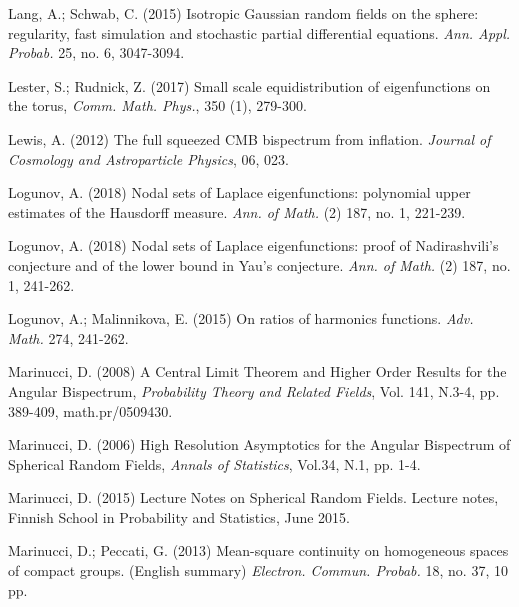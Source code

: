\begin{thebibliography}{99}
	
	 Lang, A.; Schwab, C. (2015) Isotropic Gaussian random fields on the sphere: regularity, fast simulation and stochastic partial differential equations. \textit{Ann. Appl. Probab.} 25, no. 6, 3047-3094.
	
	  Lester, S.; Rudnick, Z. (2017) Small scale equidistribution of eigenfunctions on the torus, \textit{Comm. Math. Phys.}, 350 (1), 279-300.
	
	 Lewis, A. (2012) The full squeezed CMB bispectrum from inflation. \textit{Journal of Cosmology and Astroparticle Physics}, 06, 023. 
	
	 Logunov, A. (2018) Nodal sets of Laplace eigenfunctions: polynomial upper estimates of the Hausdorff measure. \textit{Ann. of Math.} (2) 187, no. 1, 221-239.
	
	 Logunov, A. (2018) Nodal sets of Laplace eigenfunctions: proof of Nadirashvili's conjecture and of the lower bound in Yau's conjecture. \textit{ Ann. of Math. }(2) 187, no. 1, 241-262.
	
	 Logunov, A.; Malinnikova, E. (2015) On ratios of harmonics functions. \textit{Adv. Math.} 274, 241-262. 
	
	
	
	
	 Marinucci, D. (2008) A Central Limit Theorem and Higher Order Results for the Angular Bispectrum, \textit{Probability Theory and Related Fields}, Vol. 141, N.3-4, pp. 389-409, math.pr/0509430.
	
	 Marinucci, D. (2006) High Resolution Asymptotics for the Angular Bispectrum of Spherical Random Fields, \textit{Annals of Statistics}, Vol.34, N.1, pp. 1-4.
	
	 Marinucci, D. (2015) Lecture Notes on Spherical Random Fields. Lecture notes, Finnish School in Probability and Statistics, June 2015.
	
	
	 Marinucci, D.; Peccati, G. (2013) Mean-square continuity on homogeneous spaces of compact groups. (English summary) 
	\textit{Electron. Commun. Probab.} 18, no. 37, 10 pp.
	

\end{thebibliography}
